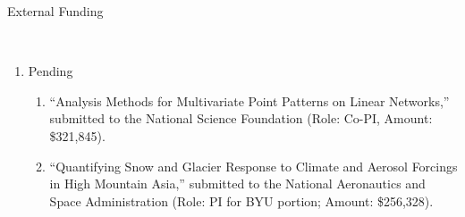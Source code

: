 \documentclass[12pt]{article}
\newcommand{\head}[1]{ %
    \bigskip %
    \begin{large}\begin{bf}{#1}\end{bf}\end{large} %

    \ \\ [-1.3cm] %

    \hrulefill}
\begin{document}
\head{External Funding}
\begin{enumerate}[label=$\bullet$]

\item Pending
\begin{enumerate}[label=$\cdot$]
\item ``Analysis Methods for Multivariate Point Patterns on Linear Networks,'' submitted to the National Science Foundation (Role: Co-PI, Amount: \$321,845).
\item ``Quantifying Snow and Glacier Response to Climate and Aerosol Forcings in High Mountain Asia,'' submitted to the National Aeronautics and Space Administration (Role: PI for BYU portion; Amount: \$256,328).
\end{enumerate}
\end{enumerate}
\end{document}
